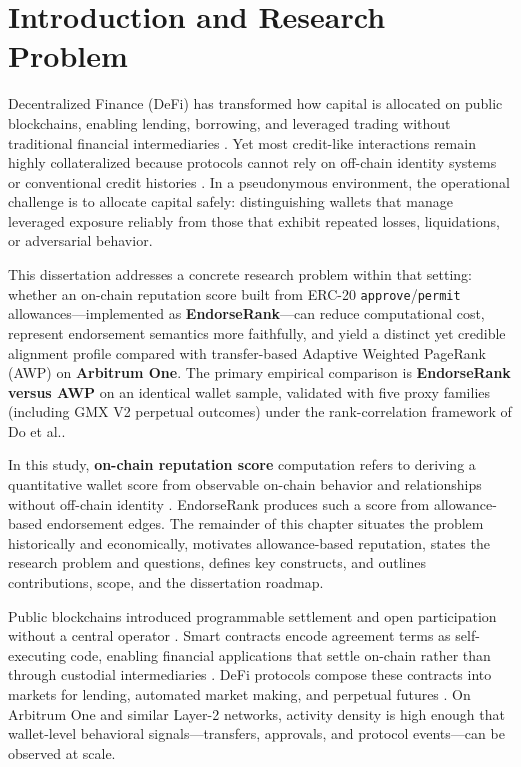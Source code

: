 \chapter{Introduction and Research Problem}
\label{ch:introduction}

Decentralized Finance (DeFi) has transformed how capital is allocated on public blockchains, enabling lending, borrowing, and leveraged trading without traditional financial intermediaries . Yet most credit-like interactions remain highly collateralized because protocols cannot rely on off-chain identity systems or conventional credit histories . In a pseudonymous environment, the operational challenge is to allocate capital safely: distinguishing wallets that manage leveraged exposure reliably from those that exhibit repeated losses, liquidations, or adversarial behavior.

This dissertation addresses a concrete research problem within that setting: whether an on-chain reputation score built from ERC-20 \texttt{approve}/\texttt{permit} allowances---implemented as \textbf{EndorseRank}---can reduce computational cost, represent endorsement semantics more faithfully, and yield a distinct yet credible alignment profile compared with transfer-based Adaptive Weighted PageRank (AWP) on \textbf{Arbitrum One}. The primary empirical comparison is \textbf{EndorseRank versus AWP} on an identical wallet sample, validated with five proxy families (including GMX V2 perpetual outcomes) under the rank-correlation framework of Do et al..

In this study, \textbf{on-chain reputation score} computation refers to deriving a quantitative wallet score from observable on-chain behavior and relationships without off-chain identity . EndorseRank produces such a score from allowance-based endorsement edges. The remainder of this chapter situates the problem historically and economically, motivates allowance-based reputation, states the research problem and questions, defines key constructs, and outlines contributions, scope, and the dissertation roadmap.


Public blockchains introduced programmable settlement and open participation without a central operator . Smart contracts encode agreement terms as self-executing code, enabling financial applications that settle on-chain rather than through custodial intermediaries . DeFi protocols compose these contracts into markets for lending, automated market making, and perpetual futures . On Arbitrum One and similar Layer-2 networks, activity density is high enough that wallet-level behavioral signals---transfers, approvals, and protocol events---can be observed at scale.

